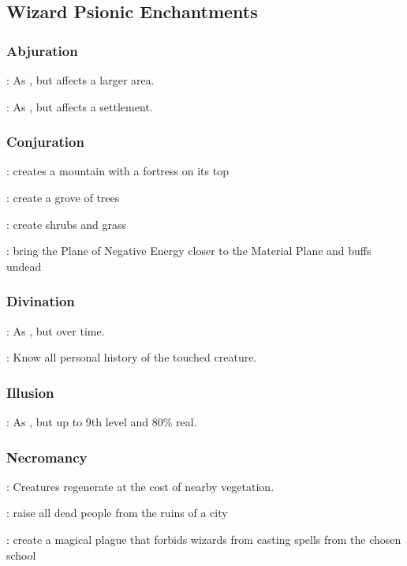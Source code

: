 \subsection{Wizard Psionic Enchantments}
\subsubsection{Abjuration}
: As , but affects a larger area.

: As , but affects a settlement.


\subsubsection{Conjuration}
: creates a mountain with a fortress on its top

: create a grove of trees

: create shrubs and grass

: bring the Plane of Negative Energy closer to the Material Plane and buffs undead


\subsubsection{Divination}
: As , but over time.

: Know all personal history of the touched creature.


\subsubsection{Illusion}
: As , but up to 9th level and 80\% real.


\subsubsection{Necromancy}
: Creatures regenerate at the cost of nearby vegetation.

: raise all dead people from the ruins of a city

: create a magical plague that forbids wizards from casting spells from the chosen school


